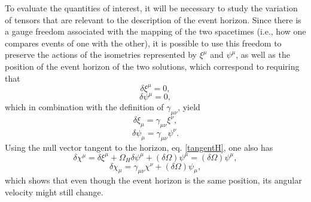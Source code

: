 \documentclass[
12pt,		%
openright,	%
twoside,  %
a4paper,			%
chapter=TITLE,		%
english,			%
french,				%
spanish,			%
brazil				%
]{USPSC-classe/USPSC}
\begin{document}
\begin{apendicesenv}
To evaluate the quantities of interest, it will be necessary to study the variation of tensors that are relevant to the description of the event horizon. Since there is a gauge freedom associated with the mapping of the two spacetimes (i.e., how one compares events of one with the other), it is possible to use this freedom to preserve the actions of the isometries represented by $\xi^{\mu}$ and $\psi^{\mu}$, as well as the position of the event horizon of the two solutions, which correspond to requiring that
\begin{equation}\label{Beq100}
    \delta\xi^{\mu}=0,
\end{equation}
\begin{equation}\label{Beq11}
    \delta\psi^{\mu}=0,
\end{equation}
which in combination with the definition of $\gamma_{\mu\nu}$, yield
\begin{equation}\label{Beq12}
    \delta\xi_{\mu}=\gamma_{\mu\nu}\xi^{\nu},
\end{equation}
\begin{equation}\label{Beq13}
    \delta\psi_{\mu}=\gamma_{\mu\nu}\psi^{\nu}.
\end{equation}
Using the null vector tangent to the horizon, eq. \ref{tangentH}, one also has
\begin{equation}\label{Beq2}
    \delta\chi^{\mu}=\delta\xi^{\mu}+\Omega_H\delta\psi^{\mu}+(\delta\Omega)\psi^{\mu}=(\delta\Omega)\psi^{\mu},
\end{equation}
\begin{equation}\label{Beq3}
    \delta\chi_{\mu}=\gamma_{\mu\nu}\chi^{\nu}+(\delta\Omega)\psi_{\mu},
\end{equation}
which shows that even though the event horizon is the same position, its angular velocity might still change.


\end{apendicesenv}
\end{document}
